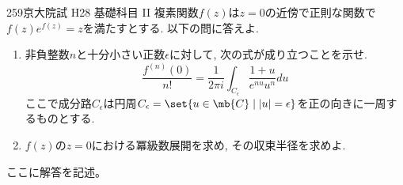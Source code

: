\begin{thm}{259}{}{京大院試 H28 基礎科目 II}
複素関数$f(z)$は$z=0$の近傍で正則な関数で$f(z)e^{f(z)} = z$を満たすとする. 以下の問に答えよ. 
\begin{enumerate}
\item 非負整数$n$と十分小さい正数$\epsilon$に対して, 次の式が成り立つことを示せ. 
\[
\dfrac{f^{(n)}(0)}{n!} = \dfrac{1}{2\pi i} \int_{C_{\epsilon}} \dfrac{1+u}{e^{nu} u^n} du
\]
ここで成分路$C_{\epsilon}$は円周$C_{\epsilon} = \set{u\in \mb{C} \mid |u| = \epsilon}$を正の向きに一周するものとする. 
\item $f(z)$の$z=0$における冪級数展開を求め, その収束半径を求めよ. 
\end{enumerate}
\end{thm}

ここに解答を記述。